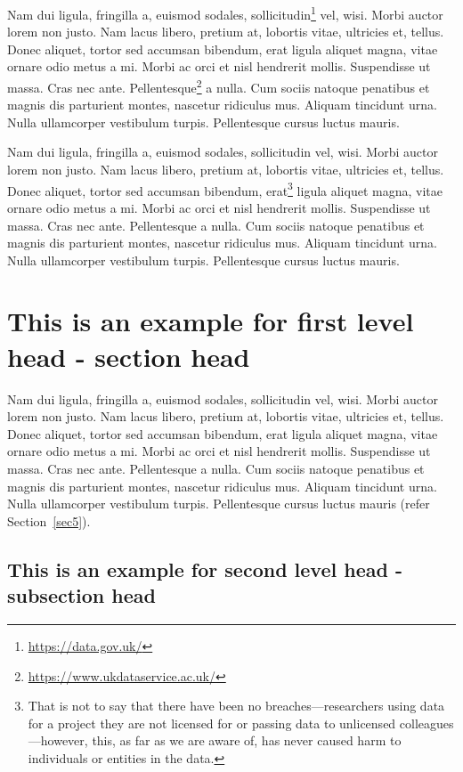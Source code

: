 \documentclass[numbers,webpdf]{ima-authoring-template}%
\theoremstyle{thmstyletwo}%
\numberwithin{equation}{section}
\begin{document}
Nam dui ligula, fringilla a, euismod sodales, sollicitudin\footnote{\url{https://data.gov.uk/}} vel, wisi. Morbi auctor lorem non justo. Nam lacus libero,
pretium at, lobortis vitae, ultricies et, tellus. Donec aliquet, tortor sed accumsan bibendum, erat ligula aliquet magna,
vitae ornare odio metus a mi. Morbi ac orci et nisl hendrerit mollis. Suspendisse ut massa. Cras nec ante. Pellentesque\footnote{\url{https://www.ukdataservice.ac.uk/}}
a nulla. Cum sociis natoque penatibus et magnis dis parturient montes, nascetur ridiculus mus. Aliquam tincidunt
urna. Nulla ullamcorper vestibulum turpis. Pellentesque cursus luctus mauris.

Nam dui ligula, fringilla a, euismod sodales, sollicitudin vel, wisi. Morbi auctor lorem non justo. Nam lacus libero,
pretium at, lobortis vitae, ultricies et, tellus. Donec aliquet, tortor sed accumsan bibendum, erat\footnote{That is not to say that there have been no breaches---researchers using data for a project they are not licensed for or passing data
to unlicensed colleagues---however, this, as far as we are aware of, has never caused harm to individuals or entities in the data.} ligula aliquet magna,
vitae ornare odio metus a mi. Morbi ac orci et nisl hendrerit mollis. Suspendisse ut massa. Cras nec ante. Pellentesque
a nulla. Cum sociis natoque penatibus et magnis dis parturient montes, nascetur ridiculus mus. Aliquam tincidunt
urna. Nulla ullamcorper vestibulum turpis. Pellentesque cursus luctus mauris.



\section{This is an example for first level head - section head}\label{sec2}

Nam dui ligula, fringilla a, euismod sodales, sollicitudin vel, wisi. Morbi auctor lorem non justo. Nam lacus libero,
pretium at, lobortis vitae, ultricies et, tellus. Donec aliquet, tortor sed accumsan bibendum, erat ligula aliquet magna,
vitae ornare odio metus a mi. Morbi ac orci et nisl hendrerit mollis. Suspendisse ut massa. Cras nec ante. Pellentesque
a nulla. Cum sociis natoque penatibus et magnis dis parturient montes, nascetur ridiculus mus. Aliquam tincidunt
urna. Nulla ullamcorper vestibulum turpis. Pellentesque cursus luctus mauris (refer Section~\ref{sec5}).

\subsection{This is an example for second level head - subsection head}\label{subsec1}
\end{document}
